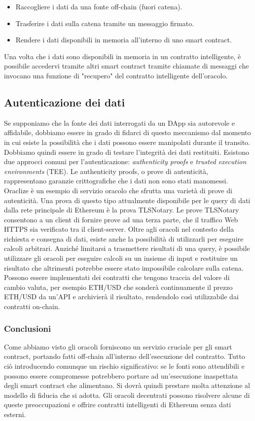 \begin{itemize}
	\item Raccogliere i dati da una fonte off-chain (fuori catena).
	\item Trasferire i dati sulla catena tramite un messaggio firmato.
	\item Rendere i dati disponibili in memoria all'interno di uno smart contract.
\end{itemize}
Una volta che i dati sono disponibili in memoria in un contratto intelligente, è possibile accedervi tramite altri smart contract tramite chiamate di messaggi che invocano una funzione di "recupero" del contratto intelligente dell'oracolo.

\subsection*{Autenticazione dei dati}
Se supponiamo che la fonte dei dati interrogati da un DApp sia autorevole e affidabile, dobbiamo essere in grado di fidarci di questo meccanismo dal momento in cui esiste la possibilità che i dati possono essere manipolati durante il transito. Dobbiamo quindi essere in grado di testare l'integrità dei dati restituiti. Esistono due approcci comuni per l'autenticazione: \textit{authenticity proofs} e \textit{trusted execution environments} (TEE). Le authenticity proofs, o prove di autenticità, rappresentano garanzie crittografiche che i dati non sono stati manomessi.  Oraclize è un esempio di servizio oracolo che sfrutta una varietà di prove di autenticità. Una prova di questo tipo attualmente disponibile per le query di dati dalla rete principale di Ethereum è la prova TLSNotary. Le prove TLSNotary consentono a un client di fornire prove ad una terza parte, che il traffico Web HTTPS sia verificato tra il client-server.
Oltre agli oracoli nel contesto della richiesta e consegna di dati, esiste anche la possibilità di utilizzarli per eseguire calcoli arbitrari. Anziché limitarsi a trasmettere risultati di una query, è possibile utilizzare gli oracoli per eseguire calcoli su un insieme di input e restituire un risultato che altrimenti potrebbe essere stato impossibile calcolare sulla catena.
Possono essere implementati dei contratti che tengono traccia del valore di cambio valuta, per esempio ETH/USD che sonderà continuamente il prezzo ETH/USD da un'API e archivierà il risultato, rendendolo così utilizzabile dai contratti on-chain.

\subsubsection{Conclusioni}
Come abbiamo visto gli oracoli forniscono un servizio cruciale per gli smart contract, portando fatti off-chain all'interno dell'esecuzione del contratto. Tutto ciò introducendo comunque un rischio significativo: se le fonti sono attendibili e possono essere compromesse potrebbero portare ad un'esecuzione inaspettata degli smart contract che alimentano. Si dovrà quindi prestare molta attenzione al modello di fiducia che si adotta. Gli oracoli decentrati possono risolvere alcune di queste preoccupazioni e offrire contratti intelligenti di Ethereum senza dati esterni. 

